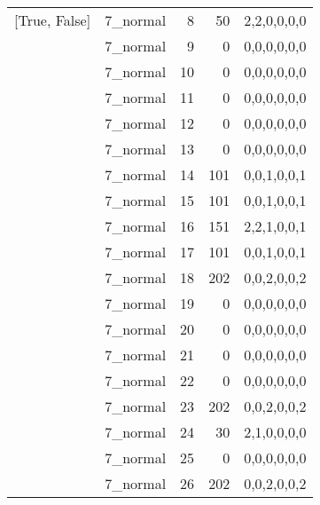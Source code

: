 \begin{tabular}{llrrl}
 [True, False]   & 7\_normal            &             8 &                    50 & 2,2,0,0,0,0   \\
 [True, False]   & 7\_normal            &             9 &                     0 & 0,0,0,0,0,0   \\
 [True, False]   & 7\_normal            &            10 &                     0 & 0,0,0,0,0,0   \\
 [True, False]   & 7\_normal            &            11 &                     0 & 0,0,0,0,0,0   \\
 [True, False]   & 7\_normal            &            12 &                     0 & 0,0,0,0,0,0   \\
 [True, False]   & 7\_normal            &            13 &                     0 & 0,0,0,0,0,0   \\
 [True, False]   & 7\_normal            &            14 &                   101 & 0,0,1,0,0,1   \\
 [True, False]   & 7\_normal            &            15 &                   101 & 0,0,1,0,0,1   \\
 [True, False]   & 7\_normal            &            16 &                   151 & 2,2,1,0,0,1   \\
 [True, False]   & 7\_normal            &            17 &                   101 & 0,0,1,0,0,1   \\
 [True, False]   & 7\_normal            &            18 &                   202 & 0,0,2,0,0,2   \\
 [True, False]   & 7\_normal            &            19 &                     0 & 0,0,0,0,0,0   \\
 [True, False]   & 7\_normal            &            20 &                     0 & 0,0,0,0,0,0   \\
 [True, False]   & 7\_normal            &            21 &                     0 & 0,0,0,0,0,0   \\
 [True, False]   & 7\_normal            &            22 &                     0 & 0,0,0,0,0,0   \\
 [True, False]   & 7\_normal            &            23 &                   202 & 0,0,2,0,0,2   \\
 [True, False]   & 7\_normal            &            24 &                    30 & 2,1,0,0,0,0   \\
 [True, False]   & 7\_normal            &            25 &                     0 & 0,0,0,0,0,0   \\
 [True, False]   & 7\_normal            &            26 &                   202 & 0,0,2,0,0,2   \\

\end{tabular}
